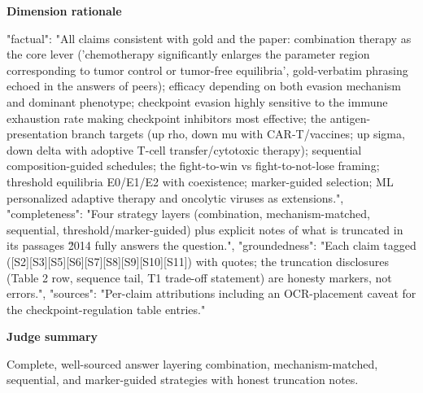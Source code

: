 \documentclass[10pt]{article}
\begin{document}
\textbf{Dimension rationale}
\begin{EvidenceText}
{
  "factual": "All claims consistent with gold and the paper: combination therapy as the core lever ('chemotherapy significantly enlarges the parameter region corresponding to tumor control or tumor-free equilibria', gold-verbatim phrasing echoed in the answers of peers); efficacy depending on both evasion mechanism and dominant phenotype; checkpoint evasion highly sensitive to the immune exhaustion rate making checkpoint inhibitors most effective; the antigen-presentation branch targets (up rho, down mu with CAR-T/vaccines; up sigma, down delta with adoptive T-cell transfer/cytotoxic therapy); sequential composition-guided schedules; the fight-to-win vs fight-to-not-lose framing; threshold equilibria E0/E1/E2 with coexistence; marker-guided selection; ML personalized adaptive therapy and oncolytic viruses as extensions.",
  "completeness": "Four strategy layers (combination, mechanism-matched, sequential, threshold/marker-guided) plus explicit notes of what is truncated in its passages \u2014 fully answers the question.",
  "groundedness": "Each claim tagged ([S2][S3][S5][S6][S7][S8][S9][S10][S11]) with quotes; the truncation disclosures (Table 2 row, sequence tail, T1 trade-off statement) are honesty markers, not errors.",
  "sources": "Per-claim attributions including an OCR-placement caveat for the checkpoint-regulation table entries."
}
\end{EvidenceText}

\textbf{Judge summary}
\begin{EvidenceText}
Complete, well-sourced answer layering combination, mechanism-matched, sequential, and marker-guided strategies with honest truncation notes.
\end{EvidenceText}
\end{document}
